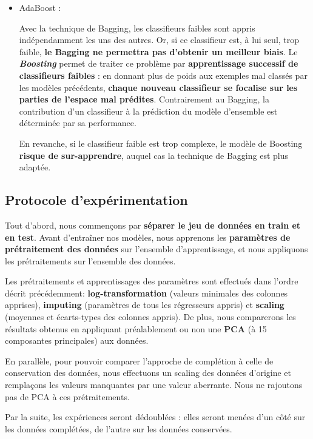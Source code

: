 \documentclass[12pt]{article}
\begin{document}
\begin{itemize}
    \item AdaBoost : 
        
        Avec la technique de Bagging, les classifieurs faibles sont appris
        indépendamment les uns des autres. Or, si ce classifieur est, à lui
        seul, trop faible, \textbf{le Bagging ne permettra pas d'obtenir un
        meilleur biais}. Le \textbf{\emph{Boosting}} permet de traiter ce
        problème par \textbf{apprentissage successif de classifieurs faibles} :
        en donnant plus de poids aux exemples mal classés par les modèles
        précédents, \textbf{chaque nouveau classifieur se focalise sur les
        parties de l'espace mal prédites}.  Contrairement au Bagging, la
        contribution d'un classifieur à la prédiction du modèle d'ensemble est
        déterminée par sa performance.

En revanche, si le classifieur faible est trop complexe, le modèle de Boosting
        \textbf{risque de sur-apprendre}, auquel cas la technique de Bagging est
        plus adaptée.

\end{itemize}

\subsection{Protocole d'expérimentation} 

Tout d'abord, nous commençons par \textbf{séparer le jeu de données en train et
en test}.  Avant d'entraîner nos modèles, nous apprenons les \textbf{paramètres
de prétraitement des données} sur l'ensemble d'apprentissage, et nous appliquons
les prétraitements sur l'ensemble des données. 

Les prétraitements et apprentissages des paramètres sont effectués dans l'ordre
décrit précédemment: \textbf{log-transformation} (valeurs minimales des colonnes
apprises), \textbf{imputing} (paramètres de tous les régresseurs appris) et
\textbf{scaling} (moyennes et écarts-types des colonnes appris). De plus, nous
comparerons les résultats obtenus en appliquant préalablement ou non une
\textbf{ PCA} (à 15 composantes principales) aux données.

En parallèle, pour pouvoir comparer l'approche de complétion à celle de
conservation des données, nous effectuons un scaling des données d'origine et
remplaçons les valeurs manquantes par une valeur aberrante. Nous ne rajoutons
pas de PCA à ces prétraitements.

Par la suite, les expériences seront dédoublées : elles seront menées d'un côté
sur les données complétées, de l'autre sur les données conservées. 
\end{document}
